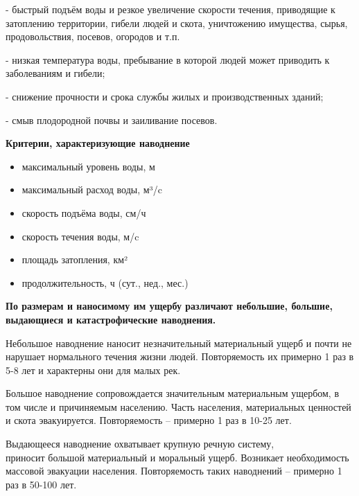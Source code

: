 \documentclass[a4paper, 12pt]{article}
\theoremstyle{definition}
\begin{document}
        - быстрый подъём воды и резкое увеличение скорости течения, приводящие к затоплению территории, гибели людей и скота, уничтожению имущества, сырья, продовольствия, посевов, огородов и т.п.

        - низкая температура воды, пребывание в которой людей может приводить к заболеваниям и гибели;

        - снижение  прочности и срока службы жилых и производственных зданий;

        - смыв плодородной почвы и заиливание посевов. 

        \begin{center}
            \textbf{ Критерии, характеризующие наводнение} 
        \end{center}

        \begin{itemize}
            \item  максимальный уровень воды, м
            \item  максимальный расход воды, м³/c
            \item скорость подъёма воды, см/ч
            \item  скорость течения воды, м/c
            \item  площадь затопления, км²
            \item  продолжительность, ч (сут., нед., мес.)
        \end{itemize}
        
        \begin{center}
            \textbf{ По размерам и наносимому им ущербу различают небольшие, большие, выдающиеся и катастрофические наводнения.} 
        \end{center}

        Небольшое наводнение наносит незначительный материальный ущерб и почти не нарушает нормального течения жизни людей. Повторяемость их  примерно 1 раз в 5-8 лет и характерны они для малых рек.

        Большое наводнение сопровождается значительным материальным ущербом, в том числе и причиняемым населению. Часть населения, материальных ценностей и скота эвакуируется. Повторяемость – примерно 1 раз в 10-25 лет.

        Выдающееся наводнение охватывает крупную речную систему,
        \\приносит большой материальный и моральный ущерб. Возникает необходимость массовой эвакуации населения. Повторяемость таких наводнений – примерно 1 раз в 50-100 лет.
\end{document}
